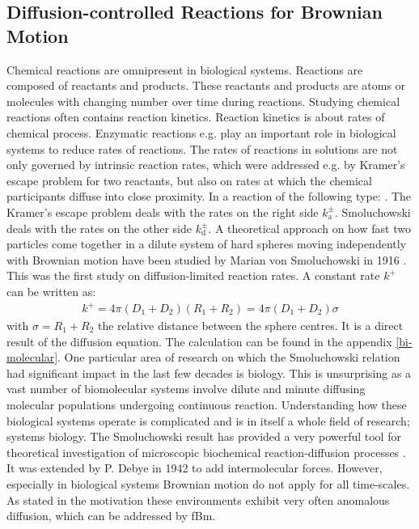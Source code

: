 \documentclass[
  a4paper,BCOR10mm,oneside,
  bibtotoc,idxtotoc,
  headsepline,footsepline,%
  fleqn,openbib
]{scrbook}
\begin{document}
\subsection{Diffusion-controlled Reactions for Brownian Motion}
Chemical reactions are omnipresent in biological systems. Reactions are composed of reactants and products. These reactants and products are atoms or molecules with changing number over time during reactions. Studying chemical reactions often contains reaction kinetics. Reaction kinetics is about rates of chemical process. Enzymatic reactions e.g. play an important role in biological systems to reduce rates of reactions. The rates of reactions in solutions are not only governed by intrinsic reaction rates, which were addressed e.g. by Kramer's escape problem for two reactants, but also on rates at which the chemical participants diffuse into close proximity. In a reaction of the following type: . \newline The Kramer's escape problem deals with the rates on the right side  $k^{\pm}_{\mathrm{a}}$. Smoluchowski deals with the rates on the other side $k^{\pm}_{\mathrm{d}}$. \newline  A theoretical approach on how fast two particles come together in a dilute system of hard spheres moving independently with Brownian motion have been studied by Marian von Smoluchowski in 1916 \cite{Smoluchowski1}. This was the first study on diffusion-limited reaction rates. A constant rate $k^{+}$ can be written as:
\begin{align}
 k^{+}=4 \pi (D_1+D_2)(R_1+R_2)=4 \pi (D_1+D_2) \sigma \label{reactionrate11}
\end{align}
with $\sigma = R_1+R_2$ the relative distance between the sphere centres.  It is a direct result of the diffusion equation. The calculation can be found in the appendix \ref{bi-molecular}. One particular area of research on which the Smoluchowski relation had significant impact in the last few decades is biology. This is unsurprising as a vast number of biomolecular systems involve dilute and minute diffusing molecular populations undergoing continuous reaction. Understanding how these biological systems operate is complicated and is in itself a whole field of research; systems biology. The Smoluchowski result has provided a very powerful tool for theoretical investigation of microscopic biochemical reaction-diffusion processes \cite{Flegg}. It was extended by P. Debye in 1942 to add intermolecular forces. However, especially in biological systems Brownian motion do not apply for all time-scales. As stated in the motivation these environments exhibit very often anomalous diffusion, which can be addressed by fBm. 
\end{document}
